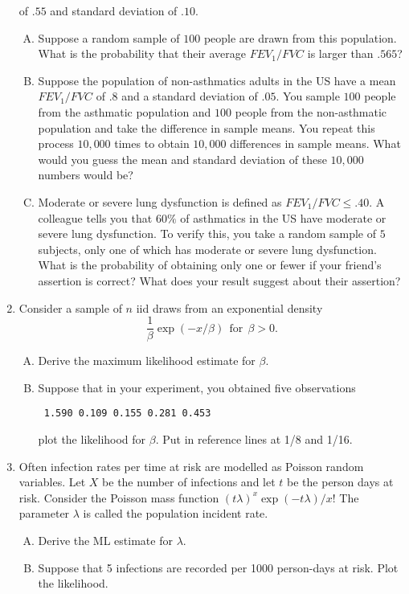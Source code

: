 \documentclass[12pt]{article}
\begin{document}
\begin{enumerate}[Problem 1.]
  of $.55$ and standard deviation of $.10$.
\begin{enumerate}[A.]
\item Suppose a random sample of $100$ people are drawn from this
  population. What is the probability that their average $FEV_1/FVC$ is
  larger than $.565$?
\item Suppose the population of non-asthmatics adults in the US have
  a mean $FEV_1/FVC$ of $.8$ and a standard deviation of $.05$.
  You sample $100$ people from the asthmatic population and
  $100$ people from the non-asthmatic population and take the
  difference in sample means. You repeat this process $10,000$
  times to obtain $10,000$ differences in sample means. What
  would you guess the mean and standard deviation of these
  $10,000$ numbers would be?
\item Moderate or severe lung dysfunction is defined as $FEV_1/FVC
  \leq .40$. A colleague tells you that $60\%$ of asthmatics
  in the US have moderate or severe lung dysfunction. To verify this,
  you take a random sample of $5$ subjects, only one of which has
  moderate or severe lung dysfunction. What is the probability of
  obtaining only one or fewer if your friend's assertion is
  correct? What does your result suggest about their
  assertion?
\end{enumerate}
\item Consider a sample of $n$ iid draws from an exponential density
$$
\frac{1}{\beta}\exp(-x / \beta) ~~\mbox{for}~~ \beta > 0.
$$
\begin{enumerate}[A.]
\item Derive the maximum likelihood estimate for $\beta$.
\item Suppose that in your experiment, you obtained five
observations
\begin{verbatim}
 1.590 0.109 0.155 0.281 0.453
\end{verbatim}
plot the likelihood for $\beta$. Put in reference lines at 1/8 and 1/16.
\end{enumerate}
\item Often infection rates per time at risk are modelled as Poisson
random variables. Let $X$ be the number of infections and let $t$ be the
person days at risk. Consider the Poisson mass function
$
(t\lambda)^x \exp(-t\lambda) / x!
$
The parameter $\lambda$ is called the population incident rate.
\begin{enumerate}[A.]
\item Derive the ML estimate for $\lambda$.
\item Suppose that 5 infections are recorded per 1000 person-days at risk. Plot the likelihood.

\end{enumerate}
\end{enumerate}
\end{document}
